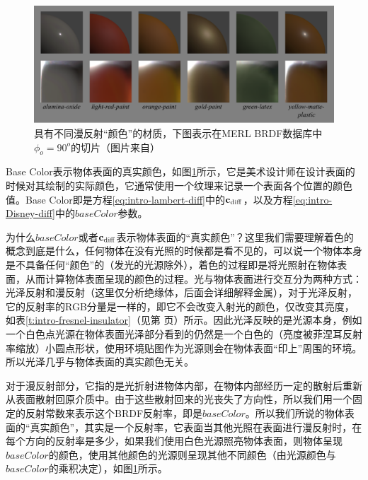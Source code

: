 \begin{figure}
	\includegraphics[width=1.0\textwidth]{figures/intro/diffusebands}
	\caption{具有不同漫反射“颜色”的材质，下图表示在MERL BRDF数据库中$\phi_o=90^o$的切片（图片来自\cite{a:PhysicallyBasedShadingatDisney}）}
	\label{f:intro-basecolor}
\end{figure}

Base Color表示物体表面的真实颜色，如图\ref{f:intro-basecolor}所示，它是美术设计师在设计表面的时候对其绘制的实际颜色，它通常使用一个纹理来记录一个表面各个位置的颜色值。Base Color即是方程\ref{eq:intro-lambert-diff}中的$\mathbf{c}_{\rm diff}$，以及方程\ref{eq:intro-Disney-diff}中的$baseColor$参数。

\begin{shaded*}
为什么$baseColor$或者$\mathbf{c}_{\rm diff}$表示物体表面的“真实颜色”？这里我们需要理解着色的概念到底是什么，任何物体在没有光照的时候都是看不见的，可以说一个物体本身是不具备任何“颜色”的（发光的光源除外），着色的过程即是将光照射在物体表面，从而计算物体表面呈现的颜色的过程。光与物体表面进行交互分为两种方式：光泽反射和漫反射（这里仅分析绝缘体，后面会详细解释金属），对于光泽反射，它的反射率的RGB分量是一样的，即它不会改变入射光的颜色，仅改变其亮度，如表\ref{t:intro-fresnel-insulator}（见第\pageref{t:intro-fresnel-insulator} 页）所示。因此光泽反映的是光源本身，例如一个白色点光源在物体表面光泽部分看到的仍然是一个白色的（亮度被菲涅耳反射率缩放）小圆点形状，使用环境贴图作为光源则会在物体表面“印上”周围的环境。所以光泽几乎与物体表面的真实颜色无关。

对于漫反射部分，它指的是光折射进物体内部，在物体内部经历一定的散射后重新从表面散射回原介质中。由于这些散射回来的光丧失了方向性，所以我们用一个固定的反射常数来表示这个BRDF反射率，即是$baseColor$。所以我们所说的物体表面的“真实颜色”，其实是一个反射率，它表面当其他光照在表面进行漫反射时，在每个方向的反射率是多少，如果我们使用白色光源照亮物体表面，则物体呈现$baseColor$的颜色，使用其他颜色的光源则呈现其他不同颜色（由光源颜色与$baseColor$的乘积决定），如图\ref{f:intro-basecolor}所示。
\end{shaded*}



